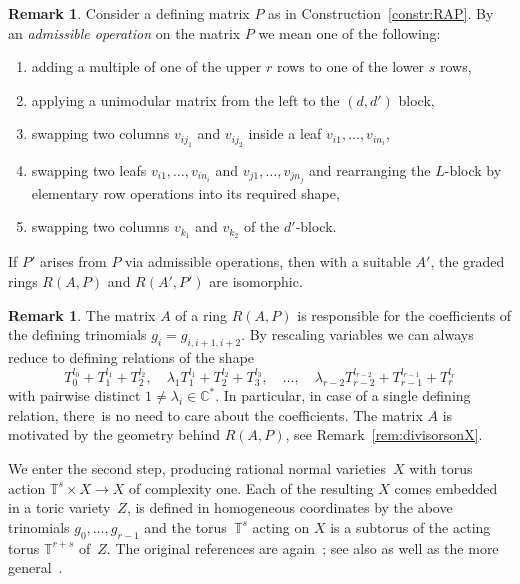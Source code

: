 \documentclass[10pt,a4paper]{amsart}
\theoremstyle{definition}
\newtheorem{rema}[thm]{Remark}
\def\CC{{\mathbb C}}
\def\TT{{\mathbb T}}
\numberwithin{equation}{section}
\begin{document}
\begin{rema}
Consider a defining matrix $P$ as in Construction~\ref{constr:RAP}.
By an \emph{admissible operation} on the matrix $P$ we mean
one of the following:
\begin{enumerate}\itemsep=0pt
\item[$(i)$]
adding a multiple of one of the upper $r$ rows
to one of the lower $s$ rows,
\item[$(ii)$]
applying a unimodular matrix from the left to the $(d,d')$
block,
\item[$(iii)$]
swapping two columns $v_{ij_1}$ and $v_{ij_2}$
inside a leaf $v_{i1}, \dots, v_{in_i}$,
\item[$(iv)$]
swapping two leafs $v_{i1}, \dots, v_{in_i}$ and
$v_{j1}, \dots, v_{jn_j}$ and rearranging the
$L$-block by elementary row operations into its
required shape,
\item[$(v)$]
swapping two columns $v_{k_1}$ and $v_{k_2}$ of the
$d'$-block.
\end{enumerate}
If $P'$ arises from $P$ via admissible operations,
then with a suitable $A'$, the graded rings
$R(A,P)$ and $R(A',P')$ are isomorphic.
\end{rema}


\begin{rema}
The matrix $A$ of a ring $R(A,P)$ is responsible
for the coefficients of the defining trinomials
$g_i = g_{i,i+1,i+2}$. By rescaling variables
we can always reduce to defining relations
of the shape
\[
T_0^{l_0} + T_1^{l_1} + T_2^{l_2},\quad
\lambda_1T_1^{l_1} + T_2^{l_2} + T_3^{l_3},\quad \dots, \quad
\lambda_{r-2}T_{r-2}^{l_{r-2}} + T_{r-1}^{l_{r-1}} + T_r^{l_r}
\]
with pairwise distinct $1 \ne \lambda_i \in \CC^*$.
In particular, in case of a single defining relation,
there~is no need to care about the coefficients.
The matrix $A$ is motivated by the geometry behind
$R(A,P)$, see Remark~\ref{rem:divisorsonX}.
\end{rema}


We enter the second step, producing
rational normal varieties~$X$ with torus action
$\TT^s \times X \to X$ of complexity one.
Each of the resulting $X$ comes embedded in a toric
variety~$Z$, is defined in homogeneous coordinates
by the above trinomials $g_0, \dots, g_{r-1}$ and
the torus~$\TT^s$ acting on $X$ is a subtorus of the
acting torus $\TT^{r+s}$ of~$Z$.
The original references are again~\cite{HaHe, HaSu};
see also \cite[Construction~3.4.3.6]{ArDeHaLa}
as well as the more
general~\cite[Constructions~3.5 and~6.13]{HaHiWr}.
\end{document}
